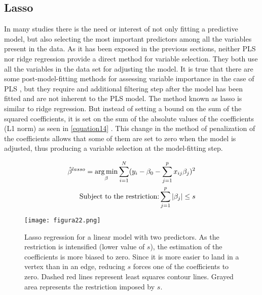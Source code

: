 \subsection{Lasso}
\label{lasso}
In many studies there is the need or interest of not only fitting a predictive model, but also selecting the most important predictors among all the variables present in the data. As it has been exposed in the previous sections, neither PLS nor ridge regression provide a direct method for variable selection. They both use all the variables in the data set for adjusting the model. It is true that there are some post-model-fitting methods for assessing variable importance in the case of PLS \parencite{mehmood2012review}, but they require and additional filtering step after the model has been fitted and are not inherent to the PLS model. The method known as lasso is similar to ridge regression. But instead of setting a bound on the sum of the squared coefficients, it is set on the sum of the absolute values of the coefficients (L1 norm) as seen in \autoref{equation14} \parencite{tibshirani1996regression}. This change in the method of penalization of the coefficients allows that some of them are set to zero when the model is adjusted, thus producing a variable selection at the model-fitting step.

\begin{equation}
\label{equation14}
\begin{split}
\hat{\beta}^{lasso}=\operatorname*{arg\,min}_\beta \sum\limits_{i=1}^N (y_{i}-\beta_{0}-\sum\limits_{j=1}^p x_{ij}\beta_{j})^{2} \\
\textrm{Subject to the restriction:}  \sum\limits_{j=1}^p |\beta_{j}|\leq s
\end{split}
\end{equation}

\vspace{10pt}

\begin{figure}[hbtp]
\centering
\texttt{[image: figura22.png]}
\caption[Lasso regression for a linear model with two predictors]{Lasso regression for a linear model with two predictors. As the restriction is intensified (lower value of $s$), the estimation of the coefficients is more biased to zero. Since it is more easier to land in a vertex than in an edge, reducing $s$ forces one of the coefficients to zero. Dashed red lines represent least squares contour lines. Grayed area represents the restriction imposed by $s$.}
\label{figura22}
\end{figure}


